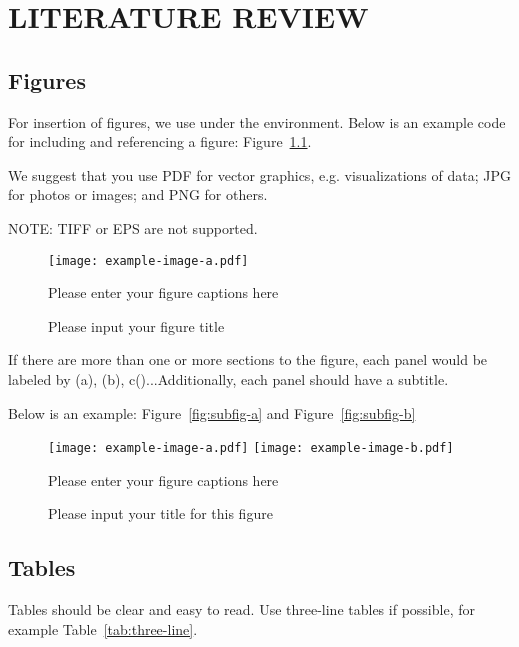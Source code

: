 
\chapter{LITERATURE REVIEW}

\section{Figures}

For insertion of figures, we use  under the  environment. Below is an example code for including and referencing a figure: Figure~\ref{fig:example}.

We suggest that you use PDF for vector graphics, e.g. visualizations of data; JPG for photos or images; and PNG for others.

NOTE: TIFF or EPS are not supported.

\begin{figure}
  \centering
  \texttt{[image: example-image-a.pdf]}
  \caption{Please input your figure title}
  {Please enter your figure captions here}
  \label{fig:example}
\end{figure}

If there are more than one or more sections to the figure, each panel would be labeled by (a), (b), c()...Additionally, each panel should have a subtitle.

Below is an example: Figure~\ref{fig:subfig-a} and Figure~\ref{fig:subfig-b}


\begin{figure}
  \centering
    {\texttt{[image: example-image-a.pdf]}}
    {\texttt{[image: example-image-b.pdf]}}
  \caption{Please input your title for this figure}
  {Please enter your figure captions here}
  \label{fig:multi-image}
\end{figure}



\section{Tables}

Tables should be clear and easy to read. Use three-line tables if possible, for example Table~\ref{tab:three-line}.

